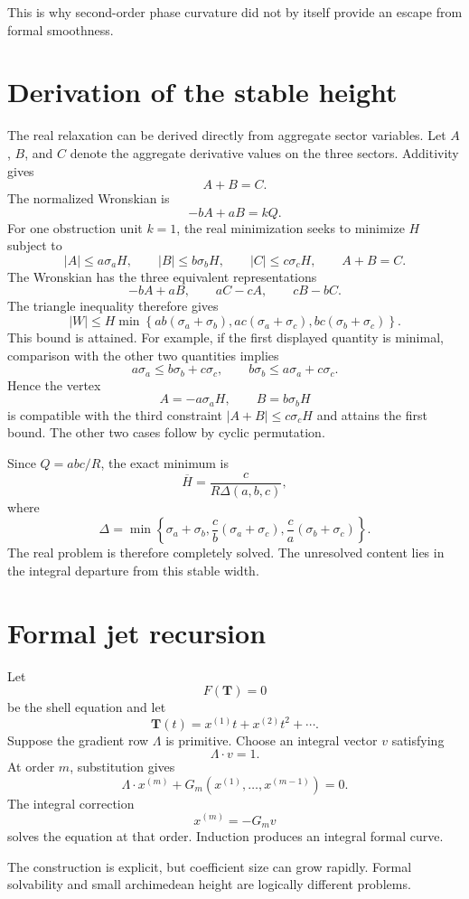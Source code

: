 This is why second-order phase curvature did not by itself provide an escape from formal smoothness.

\section{Derivation of the stable height}
The real relaxation can be derived directly from aggregate sector variables. Let $A$, $B$, and $C$ denote the aggregate derivative values on the three sectors. Additivity gives
\[
 A+B=C.
\]
The normalized Wronskian is
\[
 -bA+aB=kQ.
\]
For one obstruction unit $k=1$, the real minimization seeks to minimize $H$ subject to
\[
 |A|\le a\sigma_aH,
 \qquad
 |B|\le b\sigma_bH,
 \qquad
 |C|\le c\sigma_cH,
 \qquad
 A+B=C.
\]
The Wronskian has the three equivalent representations
\[
 -bA+aB,
 \qquad
 aC-cA,
 \qquad
 cB-bC.
\]
The triangle inequality therefore gives
\[
 |W|\le H\min\left\{
 ab(\sigma_a+\sigma_b),
 ac(\sigma_a+\sigma_c),
 bc(\sigma_b+\sigma_c)
 \right\}.
\]
This bound is attained. For example, if the first displayed quantity is minimal, comparison with the other two quantities implies
\[
 a\sigma_a\le b\sigma_b+c\sigma_c,
 \qquad
 b\sigma_b\le a\sigma_a+c\sigma_c.
\]
Hence the vertex
\[
 A=-a\sigma_aH,
 \qquad
 B=b\sigma_bH
\]
is compatible with the third constraint $|A+B|\le c\sigma_cH$ and attains the first bound. The other two cases follow by cyclic permutation.

Since $Q=abc/R$, the exact minimum is
\[
 \overline H
 =
 \frac{c}{R\Delta(a,b,c)},
\]
where
\[
 \Delta
 =
 \min\left\{
 \sigma_a+\sigma_b,
 \frac cb(\sigma_a+\sigma_c),
 \frac ca(\sigma_b+\sigma_c)
 \right\}.
\]
The real problem is therefore completely solved. The unresolved content lies in the integral departure from this stable width.

\section{Formal jet recursion}
Let
\[
 F(\mathbf T)=0
\]
be the shell equation and let
\[
 \mathbf T(t)=x^{(1)}t+x^{(2)}t^2+\cdots.
\]
Suppose the gradient row $\Lambda$ is primitive. Choose an integral vector $v$ satisfying
\[
 \Lambda\cdot v=1.
\]
At order $m$, substitution gives
\[
 \Lambda\cdot x^{(m)}
 +
 G_m(x^{(1)},\ldots,x^{(m-1)})
 =0.
\]
The integral correction
\[
 \boxed{
 x^{(m)}
 =
 -G_m v
 }
\]
solves the equation at that order. Induction produces an integral formal curve.

The construction is explicit, but coefficient size can grow rapidly. Formal solvability and small archimedean height are logically different problems.

